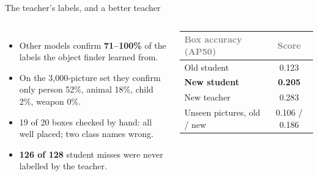 \documentclass[aspectratio=169,11pt]{beamer}
\newcommand{\h}[1]{\textcolor{grey}{#1}}
\newcommand{\remark}[1]{\par\vspace{0.35cm}{\small\textcolor{grey}{#1}}}
\begin{document}
\begin{frame}{The teacher's labels, and a better teacher}
\begin{columns}[T]
\small
\begin{itemize}\setlength\itemsep{6pt}
  \item Other models confirm \textbf{71--100\%} of the labels the object finder learned from.
  \item On the 3,000-picture set they confirm only person 52\%, animal 18\%, child 2\%, weapon 0\%.
  \item 19 of 20 boxes checked by hand: all well placed; two class names wrong.
  \item \textbf{126 of 128} student misses were never labelled by the teacher.
\end{itemize}
\small
\begin{tabular}{@{}l c@{}}
\toprule
\h{Box accuracy (AP50)} & \h{Score}\\
\midrule
Old student & 0.123\\
\textbf{New student} & \textbf{0.205}\\
New teacher & 0.283\\
\midrule
Unseen pictures, old / new & 0.106 / 0.186\\
\bottomrule
\end{tabular}
\end{columns}
\remark{Biggest gains on classes the old teacher never labelled: building 0.05 $\to$ 0.23, vehicle 0 $\to$ 0.23, child 0.05 $\to$ 0.13.}
\end{frame}
\end{document}
